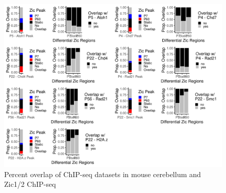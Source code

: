 \documentclass[fleqn,10pt,twocolumn]{wlscirep}
\begin{document}
\begin{figure}[ht]
\centering
\includegraphics[width=.95\textwidth]{Figures/supp_figure_chip_overlap.png }
\caption{Percent overlap of ChIP-seq datasets in mouse cerebellum and Zic1/2 ChIP-seq}
\label{fig:chip_overlap}
\end{figure}
\end{document}
